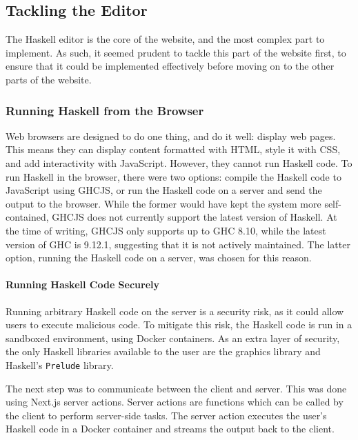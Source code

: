 \documentclass[../main.tex]{subfiles}
\begin{document}
        \subsection{Tackling the Editor}
            The Haskell editor is the core of the website, and the most complex part to
                implement.
            As such, it seemed prudent to tackle this part of the website first, to ensure
                that it could be implemented effectively before moving on to the other parts of
                the website.

            \subsubsection{Running Haskell from the Browser}
                Web browsers are designed to do one thing, and do it well: display web pages.
                This means they can display content formatted with HTML, style it with CSS, and
                    add interactivity with JavaScript.
                However, they cannot run Haskell code.
                To run Haskell in the browser, there were two options: compile the Haskell code
                    to JavaScript using GHCJS, or run the Haskell code on a server and send the
                    output to the browser.
                While the former would have kept the system more self-contained, GHCJS does not
                    currently support the latest version of Haskell.
                At the time of writing, GHCJS only supports up to GHC 8.10, while the latest
                    version of GHC is 9.12.1, suggesting that it is not actively maintained.
                The latter option, running the Haskell code on a server, was chosen for this
                    reason.

                \paragraph{Running Haskell Code Securely}
                    Running arbitrary Haskell code on the server is a security risk, as it could
                        allow users to execute malicious code.
                    To mitigate this risk, the Haskell code is run in a sandboxed environment,
                        using Docker containers.
                    As an extra layer of security, the only Haskell libraries available to the user
                        are the graphics library and Haskell's \texttt{Prelude} library.

                    The next step was to communicate between the client and server.
                    This was done using Next.js server actions.
                    Server actions are functions which can be called by the client to perform
                        server-side tasks.
                    The server action executes the user's Haskell code in a Docker container and
                        streams the output back to the client.
\end{document}
